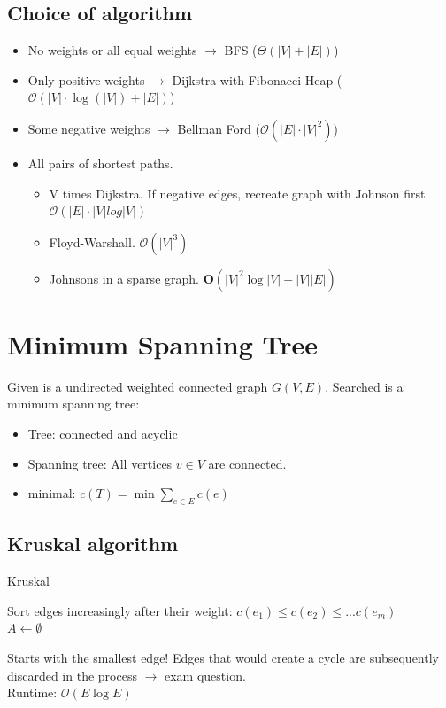 \documentclass[10pt,landscape,a4paper, table]{extarticle}
\begin{document}
\begin{multicols*}{3}
\subsection{Choice of algorithm}
\begin{itemize}
	\item No weights or all equal weights $\rightarrow$ BFS ($\Theta(|V|+|E|)$)
	\item Only positive weights $\rightarrow$ Dijkstra with Fibonacci Heap ($\mathcal{O}(|V|\cdot \log(|V|) + |E|)$)
	\item Some negative weights $\rightarrow$ Bellman Ford ($\mathcal{O}(|E|\cdot|V|^2)$)
	\item All pairs of shortest paths.
	\begin{itemize}
	    \item V times Dijkstra. If negative edges, recreate graph with Johnson first $\mathcal{O}(|E| \cdot |V|  log |V| )$
	    \item Floyd-Warshall. $\mathcal{O}( |V|^3 )$
	    \item Johnsons in a sparse graph. $\mathbf{O}(|V|^{2}\log |V|+|V||E|)$
	\end{itemize} 
	
\end{itemize}

\section{Minimum Spanning Tree}
Given is a undirected weighted connected graph $G(V,E)$. Searched is a minimum spanning tree:
\begin{itemize}
    \item Tree: connected and acyclic
    \item Spanning tree: All vertices $v \in V$ are connected.
    \item minimal: $c(T) = \min \sum_{e \in E} c(e)$
\end{itemize}
\subsection{Kruskal algorithm}

{\scriptsize
\begin{algorithm}[H]
    \caption{Kruskal}
    \label{FWAlgorithm}
    \SetAlgoLined
    Sort edges increasingly after their weight:
    $c(e_1) \leq c(e_2) \leq... c(e_m)$\\
    $A \leftarrow \emptyset$
\end{algorithm}}
Starts with the smallest edge! Edges that would create a cycle are subsequently discarded in the process $\rightarrow$ exam question.\\
Runtime: $\mathcal{O}(E \log E)$

\end{multicols*}
\end{document}
